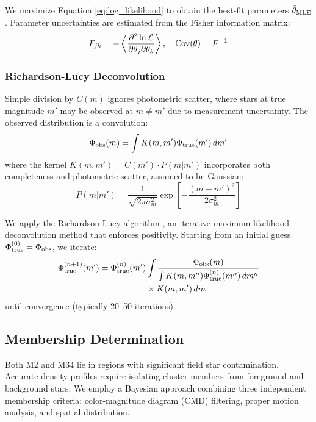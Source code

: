 \documentclass[linenumbers,trackchanges,twocolumn]{aastex701}
\begin{document}
We maximize Equation \ref{eq:log_likelihood} to obtain the best-fit parameters $\hat{\theta}_{\rm MLE}$. Parameter uncertainties are estimated from the Fisher information matrix:
\begin{equation}
F_{jk} = -\left\langle \frac{\partial^2 \ln \mathcal{L}}{\partial \theta_j \partial \theta_k} \right\rangle, \quad {\rm Cov}(\theta) = F^{-1}
\end{equation}

\subsubsection{Richardson-Lucy Deconvolution}

Simple division by $C(m)$ ignores photometric scatter, where stars at true magnitude $m'$ may be observed at $m \neq m'$ due to measurement uncertainty. The observed distribution is a convolution:
\begin{equation}
\Phi_{\rm obs}(m) = \int K(m, m') \Phi_{\rm true}(m') \, dm'
\end{equation}
where the kernel $K(m, m') = C(m') \cdot P(m | m')$ incorporates both completeness and photometric scatter, assumed to be Gaussian:
\begin{equation}
P(m | m') = \frac{1}{\sqrt{2\pi\sigma_m^2}} \exp\left[ -\frac{(m - m')^2}{2\sigma_m^2} \right]
\end{equation}

We apply the Richardson-Lucy algorithm \citep{richardson1972,lucy1974}, an iterative maximum-likelihood deconvolution method that enforces positivity. Starting from an initial guess $\Phi_{\rm true}^{(0)} = \Phi_{\rm obs}$, we iterate:
\begin{equation}
\begin{split}
\Phi_{\rm true}^{(n+1)}(m') = \Phi_{\rm true}^{(n)}(m') &\int \frac{\Phi_{\rm obs}(m)}{\int K(m, m'') \Phi_{\rm true}^{(n)}(m'') \, dm''} \\
&\times K(m, m') \, dm
\end{split}
\end{equation}
until convergence (typically 20--50 iterations).

\subsection{Membership Determination} \label{subsec:membership}

Both M2 and M34 lie in regions with significant field star contamination. Accurate density profiles require isolating cluster members from foreground and background stars. We employ a Bayesian approach combining three independent membership criteria: color-magnitude diagram (CMD) filtering, proper motion analysis, and spatial distribution.
\end{document}
